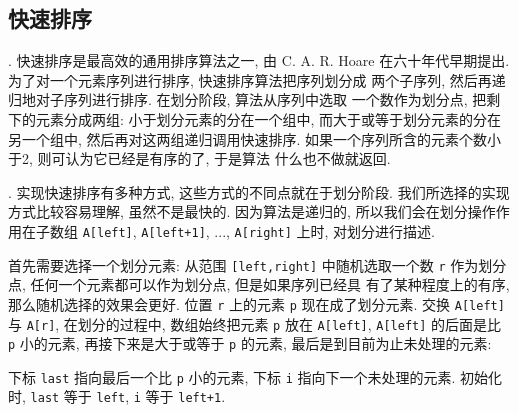 \subsection{快速排序}
\label{subsec:quicksort}

. 快速排序是最高效的通用排序算法之一, 由 C. A. R. Hoare
在六十年代早期提出. 为了对一个元素序列进行排序, 快速排序算法把序列划分成
两个子序列, 然后再递归地对子序列进行排序. 在划分阶段, 算法从序列中选取
一个数作为划分点, 把剩下的元素分成两组: 小于划分元素的分在一个组中, 
而大于或等于划分元素的分在另一个组中, 然后再对这两组递归调用快速排序.
如果一个序列所含的元素个数小于2, 则可认为它已经是有序的了, 于是算法
什么也不做就返回.

. 实现快速排序有多种方式, 这些方式的不同点就在于划分阶段.
我们所选择的实现方式比较容易理解, 虽然不是最快的. 因为算法是递归的,
所以我们会在划分操作作用在子数组 \texttt{A[left]}, \texttt{A[left+1]},
..., \texttt{A[right]} 上时, 对划分进行描述.

首先需要选择一个划分元素: 从范围 \texttt{[left,right]} 中随机选取一个数
\texttt{r} 作为划分点, 任何一个元素都可以作为划分点, 但是如果序列已经具
有了某种程度上的有序, 那么随机选择的效果会更好. 位置 \texttt{r} 上的元素
\texttt{p} 现在成了划分元素. 交换 \texttt{A[left]} 与 \texttt{A[r]},
在划分的过程中, 数组始终把元素 \texttt{p} 放在 \texttt{A[left]}, 
\texttt{A[left]} 的后面是比 \texttt{p} 小的元素, 再接下来是大于或等于
\texttt{p} 的元素, 最后是到目前为止未处理的元素:
\begin{center}
\end{center}

下标 \texttt{last} 指向最后一个比 \texttt{p} 小的元素, 下标 \texttt{i}
指向下一个未处理的元素. 初始化时, \texttt{last} 等于 \texttt{left},
\texttt{i} 等于 \texttt{left+1}.

